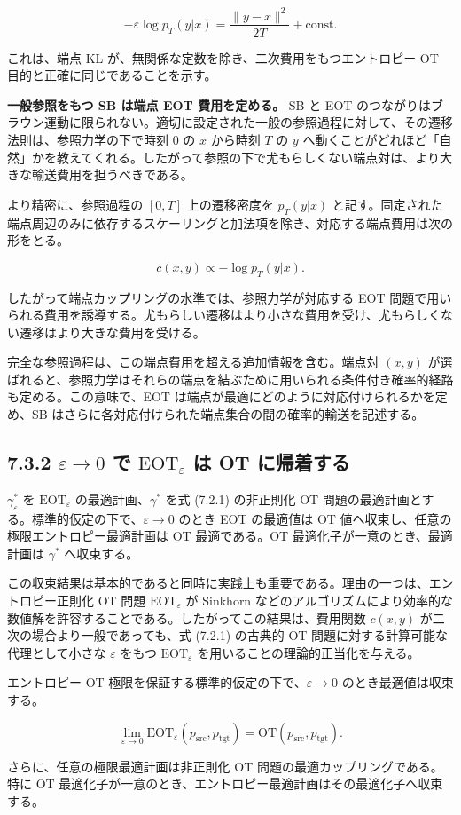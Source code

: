 \[
-\varepsilon\log p_T(y|x)=\frac{\|y-x\|^2}{2T}+\mathrm{const}.
\]


これは、端点 KL が、無関係な定数を除き、二次費用をもつエントロピー OT 目的と正確に同じであることを示す。

\textbf{一般参照をもつ SB は端点 EOT 費用を定める。} SB と EOT のつながりはブラウン運動に限られない。適切に設定された一般の参照過程に対して、その遷移法則は、参照力学の下で時刻 $0$ の $x$ から時刻 $T$ の $y$ へ動くことがどれほど「自然」かを教えてくれる。したがって参照の下で尤もらしくない端点対は、より大きな輸送費用を担うべきである。

より精密に、参照過程の $[0,T]$ 上の遷移密度を $p_T(y|x)$ と記す。固定された端点周辺のみに依存するスケーリングと加法項を除き、対応する端点費用は次の形をとる。

\[
c(x,y)\propto -\log p_T(y|x).
\]


したがって端点カップリングの水準では、参照力学が対応する EOT 問題で用いられる費用を誘導する。尤もらしい遷移はより小さな費用を受け、尤もらしくない遷移はより大きな費用を受ける。

完全な参照過程は、この端点費用を超える追加情報を含む。端点対 $(x,y)$ が選ばれると、参照力学はそれらの端点を結ぶために用いられる条件付き確率的経路も定める。この意味で、EOT は端点が最適にどのように対応付けられるかを定め、SB はさらに各対応付けられた端点集合の間の確率的輸送を記述する。

\subsection*{7.3.2 $\varepsilon\to 0$ で $\mathrm{EOT}_\varepsilon$ は OT に帰着する}


$\gamma_\varepsilon^*$ を $\mathrm{EOT}_\varepsilon$ の最適計画、$\gamma^*$ を式 (7.2.1) の非正則化 OT 問題の最適計画とする。標準的仮定の下で、$\varepsilon\to 0$ のとき EOT の最適値は OT 値へ収束し、任意の極限エントロピー最適計画は OT 最適である。OT 最適化子が一意のとき、最適計画は $\gamma^*$ へ収束する。

この収束結果は基本的であると同時に実践上も重要である。理由の一つは、エントロピー正則化 OT 問題 $\mathrm{EOT}_\varepsilon$ が Sinkhorn などのアルゴリズムにより効率的な数値解を許容することである。したがってこの結果は、費用関数 $c(x,y)$ が二次の場合より一般であっても、式 (7.2.1) の古典的 OT 問題に対する計算可能な代理として小さな $\varepsilon$ をもつ $\mathrm{EOT}_\varepsilon$ を用いることの理論的正当化を与える。

\begin{propositionbox}
エントロピー OT 極限を保証する標準的仮定の下で、$\varepsilon\to 0$ のとき最適値は収束する。

\[
\lim_{\varepsilon\to 0}\mathrm{EOT}_\varepsilon(p_{\mathrm{src}},p_{\mathrm{tgt}})=\mathrm{OT}(p_{\mathrm{src}},p_{\mathrm{tgt}}).
\]

さらに、任意の極限最適計画は非正則化 OT 問題の最適カップリングである。特に OT 最適化子が一意のとき、エントロピー最適計画はその最適化子へ収束する。
\end{propositionbox}


